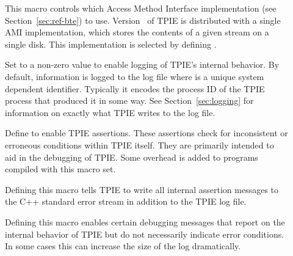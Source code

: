 \begin{description}
    \item[{}] This macro controls
    which Access Method Interface implementation (see
    Section~\ref{sec:ref-bte}) to use. Version \version~of
    TPIE is distributed with a single AMI implementation,
    which stores the contents of a given stream on a single
    disk. This implementation is selected by defining
    . 
  
  
  \item[{}] Set to a non-zero value to
  enable logging of TPIE's internal behavior. By default, information is logged to the
  log file  where
   is a unique system dependent identifier.
  Typically it encodes the process ID of the TPIE process
  that produced it in some way. See
  Section~\ref{sec:logging} for information on exactly what
  TPIE writes to the log file.

  
  \item[{}] Define to enable TPIE
  assertions. These assertions check for inconsistent or
  erroneous conditions within TPIE itself. They are
  primarily intended to aid in the debugging of TPIE. Some
  overhead is added to programs compiled with this macro
  set.

  
  \item[{}] Defining this macro tells
  TPIE to write all internal assertion messages to the C++
  standard error stream  in addition to the
  TPIE log file.

 
 \item[{}] Defining this macro enables
 certain debugging messages that report on the internal
 behavior of TPIE but do not necessarily indicate error
 conditions. In some cases this can increase the size of the
 log dramatically.


\end{description}


